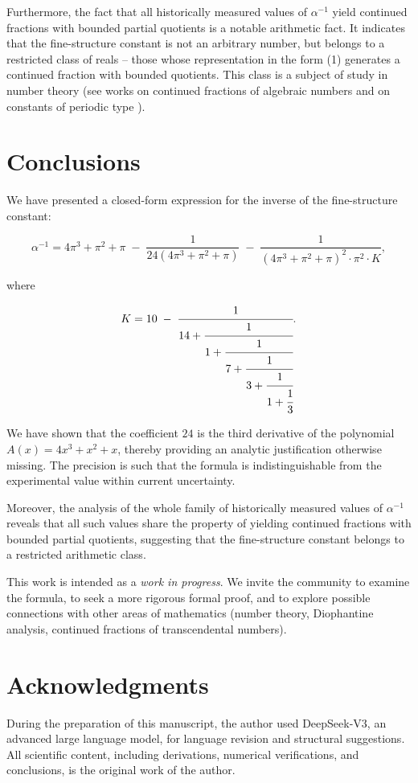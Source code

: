 \documentclass[12pt]{article}
\begin{document}
Furthermore, the fact that all historically measured values of $\alpha^{-1}$ yield continued fractions with bounded partial quotients is a notable arithmetic fact. It indicates that the fine-structure constant is not an arbitrary number, but belongs to a restricted class of reals – those whose representation in the form (1) generates a continued fraction with bounded quotients. This class is a subject of study in number theory (see works on continued fractions of algebraic numbers and on constants of periodic type \cite{perron1913, khinchin1964}).

\section{Conclusions}

We have presented a closed-form expression for the inverse of the fine-structure constant:

\[
\alpha^{-1} = 4\pi^3 + \pi^2 + \pi \;-\; \frac{1}{24(4\pi^3+\pi^2+\pi)} \;-\; \frac{1}{(4\pi^3+\pi^2+\pi)^2 \cdot \pi^2 \cdot K},
\]

where

\[
K = 10 \;-\; \cfrac{1}{14 + \cfrac{1}{1 + \cfrac{1}{7 + \cfrac{1}{3 + \cfrac{1}{1 + \cfrac{1}{3}}}}}}.
\]

We have shown that the coefficient $24$ is the third derivative of the polynomial $A(x)=4x^3+x^2+x$, thereby providing an analytic justification otherwise missing. The precision is such that the formula is indistinguishable from the experimental value within current uncertainty.

Moreover, the analysis of the whole family of historically measured values of $\alpha^{-1}$ reveals that all such values share the property of yielding continued fractions with bounded partial quotients, suggesting that the fine-structure constant belongs to a restricted arithmetic class.

This work is intended as a \textit{work in progress}. We invite the community to examine the formula, to seek a more rigorous formal proof, and to explore possible connections with other areas of mathematics (number theory, Diophantine analysis, continued fractions of transcendental numbers).

\section*{Acknowledgments}

During the preparation of this manuscript, the author used DeepSeek-V3, an advanced large language model, for language revision and structural suggestions. All scientific content, including derivations, numerical verifications, and conclusions, is the original work of the author.
\end{document}

